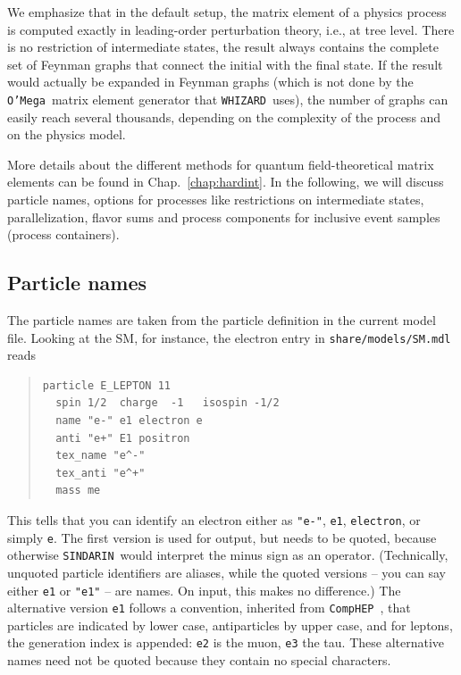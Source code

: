 \documentclass[12pt]{book}
\newcommand{\ttt}[1]{\texttt{#1}}
\newcommand{\whizard}{\ttt{WHIZARD}}
\newcommand{\oMega}{\ttt{O'Mega}}
\newcommand{\comphep}{\ttt{CompHEP}}
\newcommand{\sindarin}{\ttt{SINDARIN}}
\begin{document}
We emphasize that in the default setup, the matrix element of a physics
process is computed exactly in leading-order perturbation theory, i.e., at
tree level.  There is no restriction of intermediate states, the result always
contains the complete set of Feynman graphs that connect the initial with the
final state.  If the result would actually be expanded in Feynman graphs
(which is not done by the \oMega\ matrix element generator that
\whizard\ uses), the number of graphs can easily reach several thousands,
depending on the complexity of the process and on the physics model.

More details about the different methods for quantum field-theoretical
matrix elements can be found in Chap.~\ref{chap:hardint}. In the
following, we will discuss particle names, options for processes like
restrictions on intermediate states, parallelization, flavor sums and
process components for inclusive event samples (process containers).


\subsection{Particle names}

The particle names are taken from the particle definition in the current model
file.  Looking at the SM, for instance, the electron entry in
\ttt{share/models/SM.mdl} reads
\begin{quote}
\begin{footnotesize}
\begin{verbatim}
particle E_LEPTON 11
  spin 1/2  charge  -1   isospin -1/2
  name "e-" e1 electron e
  anti "e+" E1 positron
  tex_name "e^-"
  tex_anti "e^+"
  mass me
\end{verbatim}
\end{footnotesize}
\end{quote}
This tells that you can identify an electron either as \verb|"e-"|, \verb|e1|,
\verb|electron|, or simply \verb|e|.  The first version is used for output,
but needs to be quoted, because otherwise \sindarin\ would interpret the minus
sign as an operator.  (Technically, unquoted particle identifiers are aliases,
while the quoted versions -- you can say either \verb|e1| or \verb|"e1"| --
are names.  On input, this makes no difference.)  The alternative version
\verb|e1| follows a convention, inherited from
\comphep~\cite{Boos:2004kh}, that particles are indicated by lower
case, antiparticles by upper case, and for leptons, the generation
index is appended: \verb|e2| is the muon, \verb|e3| the tau.  These
alternative names need not be quoted because they contain no special
characters.
\end{document}
